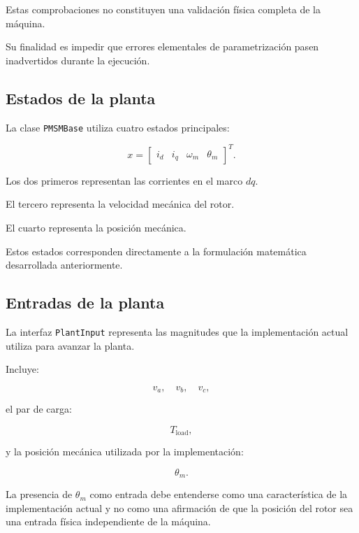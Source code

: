 Estas comprobaciones no constituyen una validación física completa de la máquina.

Su finalidad es impedir que errores elementales de parametrización pasen inadvertidos durante la ejecución.

\subsection{Estados de la planta}

La clase \texttt{PMSMBase} utiliza cuatro estados principales:

\begin{equation}
x=
\begin{bmatrix}
i_d&
i_q&
\omega_m&
\theta_m
\end{bmatrix}^{T}.
\end{equation}

Los dos primeros representan las corrientes en el marco $dq$.

El tercero representa la velocidad mecánica del rotor.

El cuarto representa la posición mecánica.

Estos estados corresponden directamente a la formulación matemática desarrollada anteriormente.

\subsection{Entradas de la planta}

La interfaz \texttt{PlantInput} representa las magnitudes que la implementación actual utiliza para avanzar la planta.

Incluye:

\begin{equation}
v_a,\quad v_b,\quad v_c,
\end{equation}

el par de carga:

\begin{equation}
T_{\mathrm{load}},
\end{equation}

y la posición mecánica utilizada por la implementación:

\begin{equation}
\theta_m.
\end{equation}

La presencia de $\theta_m$ como entrada debe entenderse como una característica de la implementación actual y no como una afirmación de que la posición del rotor sea una entrada física independiente de la máquina.

